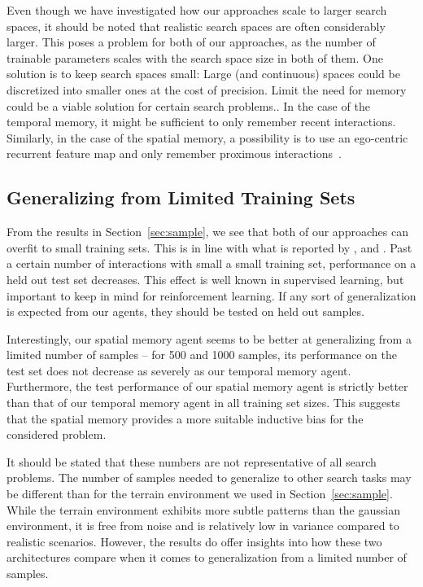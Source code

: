 Even though we have investigated how our approaches scale to larger search spaces,
it should be noted that realistic search spaces are often considerably larger.
This poses a problem for both of our approaches, as the number of trainable parameters scales with the search space size in both of them.
One solution is to keep search spaces small:
Large (and continuous) spaces could be discretized into smaller ones at the cost of precision.
Limit the need for memory could be a viable solution for certain search problems..
In the case of the temporal memory, it might be sufficient to only remember recent interactions.
Similarly, in the case of the spatial memory, a possibility is to use an ego-centric recurrent feature map and only remember proximous interactions~\cite{parisotto_neural_2017}.

\subsection{Generalizing from Limited Training Sets}

From the results in Section~\ref{sec:sample}, we see that both of our approaches can overfit to small training sets.
This is in line with what is reported by \cite{cobbe_quantifying_2019}, \cite{cobbe_leveraging_2020} and \cite{zhang_study_2018}.
Past a certain number of interactions with small a small training set, performance on a held out test set decreases.
This effect is well known in supervised learning, but important to keep in mind for reinforcement learning.
If any sort of generalization is expected from our agents, they should be tested on held out samples.

Interestingly, our spatial memory agent seems to be better at generalizing from a limited number of samples --
for 500 and 1000 samples, its performance on the test set does not decrease as severely as our temporal memory agent.
Furthermore, the test performance of our spatial memory agent is strictly better than that of our temporal memory agent in all training set sizes.
This suggests that the spatial memory provides a more suitable inductive bias for the considered problem.

It should be stated that these numbers are not representative of all search problems.
The number of samples needed to generalize to other search tasks may be different than for the terrain environment we used in Section~\ref{sec:sample}.
While the terrain environment exhibits more subtle patterns than the gaussian environment, it is free from noise and is relatively low in variance compared to realistic scenarios.
However, the results do offer insights into how these two architectures compare when it comes to generalization from a limited number of samples.

